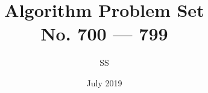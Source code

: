 \documentclass[a4paper,12pt]{article}
\title{Algorithm Problem Set \\ \large No. 700 --- 799}
\author{SS}
\date{July 2019}
\begin{document}
\renewcommand{\thelstlisting}{\thesection.\arabic{lstlisting}}
\newcommand{\fcc}[1]{\lstinline[language=C++, basicstyle=\small\ttfamily, keywordstyle=\bfseries\color{green!40!black}]|#1|}
\newcommand{\fcj}[1]{\lstinline[language=Java, basicstyle=\small\ttfamily, keywordstyle=\bfseries\color{green!40!black}]|#1|}
\maketitle




% 
% 
% 
% 
% 
% 
% 
% 
% 
% 

%
%
%
%
%
%
%
%
%
%
%
%
%
%
%
%
%
%
%
%
%
%
%
%
%
%
%
%
%
%
%
%
%
%
%
%
%
%
%
%
%
%
%



















%









\end{document}

